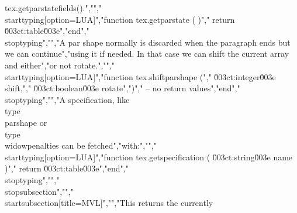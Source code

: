 {tex.getparstatefields()}.","","\\starttyping[option=LUA]","function tex.getparstate ( )","    return \u003ct:table\u003e","end","\\stoptyping","","A par shape normally is discarded when the paragraph ends but we can continue","using it if needed. In that case we can shift the current array and either","or not rotate.","","\\starttyping[option=LUA]","function tex.shiftparshape (","    \u003ct:integer\u003e shift,","    \u003ct:boolean\u003e rotate",")","    -- no return values","end","\\stoptyping","","A specification, like \\type {\\parshape} or \\type {\\widowpenalties} can be fetched","with:","","\\starttyping[option=LUA]","function tex.getspecification ( \u003ct:string\u003e name )","    return \u003ct:table\u003e","end","\\stoptyping","","\\stopsubsection","","\\startsubsection[title=MVL]","","This returns the currently